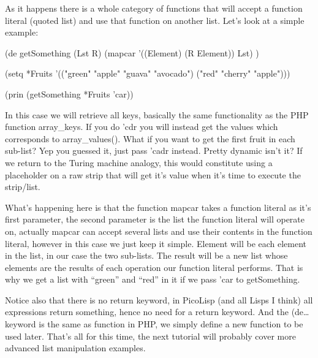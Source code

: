 As it happens there is a whole category of functions that will accept a
function literal (quoted list) and use that function on another list.
Let's look at a simple example:

\begin{wideverbatim}
(de getSomething (Lst R)
    (mapcar '((Element) (R Element)) Lst) )

(setq *Fruits 
      '(("green" "apple" "guava" "avocado") 
        ("red" "cherry" "apple")))

(prin (getSomething *Fruits 'car))
\end{wideverbatim}

In this case we will retrieve all keys, basically the same functionality
as the PHP function array\_keys. If you do 'cdr you will instead get the
values which corresponds to array\_values(). What if you want to get the
first fruit in each sub-list? Yep you guessed it, just pass 'cadr
instead. Pretty dynamic isn't it? If we return to the Turing machine
analogy, this would constitute using a placeholder on a raw strip that
will get it's value when it's time to execute the strip/list.

What's happening here is that the function mapcar takes a function
literal as it's first parameter, the second parameter is the list the
function literal will operate on, actually mapcar can accept several
lists and use their contents in the function literal, however in this
case we just keep it simple. Element will be each element in the list,
in our case the two sub-lists. The result will be a new list whose
elements are the results of each operation our function literal
performs. That is why we get a list with ``green'' and ``red'' in it if we
pass 'car to getSomething.

Notice also that there is no return keyword, in PicoLisp (and all Lisps
I think) all expressions return something, hence no need for a return
keyword. And the (de… keyword is the same as function in PHP, we simply
define a new function to be used later. That's all for this time, the
next tutorial will probably cover more advanced list manipulation
examples.

